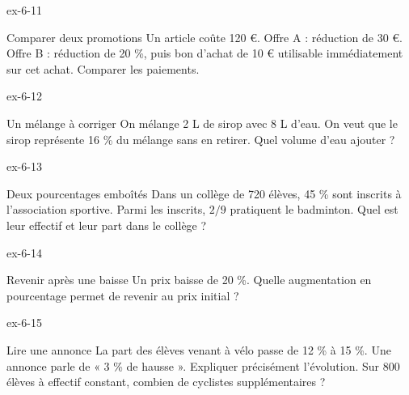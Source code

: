 \clearpage{}
\begin{blocLivre}{ex-6-11}\begin{exercice}[3]{Comparer deux promotions}
Un article coûte 120 €. Offre A : réduction de 30 €. Offre B : réduction de 20 \%, puis bon d’achat de 10 € utilisable immédiatement sur cet achat. Comparer les paiements.
\end{exercice}\end{blocLivre}
\begin{blocLivre}{ex-6-12}\begin{exercice}[3]{Un mélange à corriger}
On mélange 2 L de sirop avec 8 L d’eau. On veut que le sirop représente 16 \% du mélange sans en retirer. Quel volume d’eau ajouter ?
\end{exercice}\end{blocLivre}
\begin{blocLivre}{ex-6-13}\begin{exercice}[3]{Deux pourcentages emboîtés}
Dans un collège de 720 élèves, 45 \% sont inscrits à l’association sportive. Parmi les inscrits, $2/9$ pratiquent le badminton. Quel est leur effectif et leur part dans le collège ?
\end{exercice}\end{blocLivre}
\begin{blocLivre}{ex-6-14}\begin{exercice}[3]{Revenir après une baisse}
Un prix baisse de 20 \%. Quelle augmentation en pourcentage permet de revenir au prix initial ?
\end{exercice}\end{blocLivre}
\begin{blocLivre}{ex-6-15}\begin{exercice}[3]{Lire une annonce}
La part des élèves venant à vélo passe de 12 \% à 15 \%. Une annonce parle de « 3 \% de hausse ». Expliquer précisément l’évolution. Sur 800 élèves à effectif constant, combien de cyclistes supplémentaires ?
\end{exercice}\end{blocLivre}

\clearpage
